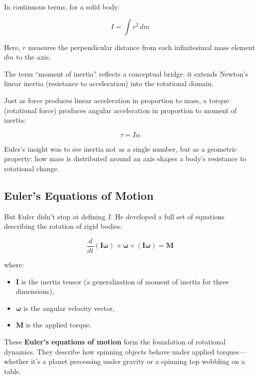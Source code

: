 In continuous terms, for a solid body:

\[
I = \int r^2 \, dm
\]

Here, \( r \) measures the perpendicular distance from each infinitesimal mass element \( dm \) to the axis.

\begin{tcolorbox}[colback=gray!5!white, colframe=black, title=\textbf{Historical Sidebar: Why “Inertia”?}, fonttitle=\bfseries, arc=1.5mm, boxrule=0.4pt]
The term “moment of inertia” reflects a conceptual bridge: it extends Newton’s linear inertia (resistance to acceleration) into the rotational domain.

Just as force produces linear acceleration in proportion to mass, a torque (rotational force) produces angular acceleration in proportion to moment of inertia:

\[
\tau = I \alpha
\]

Euler’s insight was to see inertia not as a single number, but as a geometric property: how mass is distributed around an axis shapes a body’s resistance to rotational change.
\end{tcolorbox}

\subsection{Euler’s Equations of Motion}

But Euler didn’t stop at defining \( I \). He developed a full set of equations describing the rotation of rigid bodies:

\[
\frac{d}{dt} (\mathbf{I} \boldsymbol{\omega}) + \boldsymbol{\omega} \times (\mathbf{I} \boldsymbol{\omega}) = \mathbf{M}
\]

where:

\begin{itemize}
    \item \( \mathbf{I} \) is the inertia tensor (a generalization of moment of inertia for three dimensions),
    \item \( \boldsymbol{\omega} \) is the angular velocity vector,
    \item \( \mathbf{M} \) is the applied torque.
\end{itemize}

These \textbf{Euler’s equations of motion} form the foundation of rotational dynamics. They describe how spinning objects behave under applied torques—whether it’s a planet precessing under gravity or a spinning top wobbling on a table.

